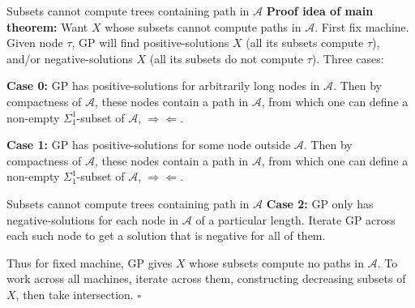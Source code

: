 \begin{frame}{Subsets cannot compute trees containing path in $\mathcal{A}$}
  \textbf{Proof idea of main theorem:} Want $X$ whose subsets cannot
  compute paths in $\mathcal{A}$. First fix machine. Given node
  $\tau$, GP will find positive-solutions $X$ (all its subsets compute
  $\tau$), and/or negative-solutions $X$ (all its subsets do not compute
  $\tau$). Three cases:

  \vspace{1em}
  \textbf{Case 0:} GP has positive-solutions for arbitrarily long nodes in
  $\mathcal{A}$. Then by compactness of $\mathcal{A}$, these nodes contain
  a path in $\mathcal{A}$, from which one can define a non-empty
  $\Sigma_1^1$-subset of $\mathcal{A}$, $\Rightarrow\Leftarrow$.

  \vspace{0.5em}
  \textbf{Case 1:} GP has positive-solutions for some node outside
  $\mathcal{A}$. Then by compactness of $\mathcal{A}$, these nodes contain
  a path in $\mathcal{A}$, from which one can define a non-empty
  $\Sigma_1^1$-subset of $\mathcal{A}$, $\Rightarrow\Leftarrow$.
\end{frame}

\begin{frame}{Subsets cannot compute trees containing path in $\mathcal{A}$}
  \textbf{Case 2:} GP only has negative-solutions for each node in
  $\mathcal{A}$ of a particular length. Iterate GP across each such node to
  get a solution that is negative for all of them.

  \vspace{1em}
  Thus for fixed machine, GP gives $X$ whose subsets compute no paths in
  $\mathcal{A}$. To work across all machines, iterate across them,
  constructing decreasing subsets of $X$, then take intersection. $\square$
\end{frame}

